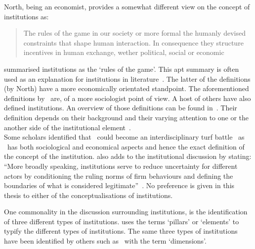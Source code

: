 North, being an economist, provides a somewhat different view on the concept of institutions as:
\begin{quote} The rules of the game in our society or more formal the humanly devised constraints that shape human interaction. In consequence they structure incentives in human exchange, wether political, social or economic~\citep{North:1990vl}
\end{quote}

\cite{North:1990vl} summarised institutions as the `rules of the game'. 
This apt summary is often used as an explanation for institutions in literature~\citep{Peng:2008b,Westney:2005vv,Jackson:2008cz,Newman:2000fc,vanEssen:2012cw,Hotho:2012uu}.
The latter of the definitions (by North) have a more economically orientated standpoint. The aforementioned definitions by~\citep{Fligstein:2001dj,Scott:2008} are, of a more sociologist point of view.
A host of others have also defined institutions. 
An overview of those definitions can be found in~\citep{Scott:2010us}. 
Their definition depends on their background and their varying attention to one or the another side of the institutional element~\citep{Scott:2010us}.\\
Some scholars identified that \inth~could become an interdisciplinary turf battle~\citep{Peng:2009vt} as \inth~has both sociological and economical aspects and hence the exact definition of the concept of the institution.
\cite{Peng:2009vt} also adds to the institutional discussion by stating:
``More broadly speaking, institutions serve to reduce uncertainty for different actors by conditioning the ruling norms of firm behaviours and defining the boundaries of what is considered legitimate''~\citep[p.66]{Peng:2008us}.
No preference is given in this thesis to either of the conceptualisations of institutions. 


One commonality in the discussion surrounding institutions, is the identification of three different types of institutions. 
\cite{Scott:2005us} uses the terms `pillars' or `elements' to typify the different types of institutions.
The same three types of institutions have been identified by others such as~\cite{Peng:2008us} with the term `dimensions'.

